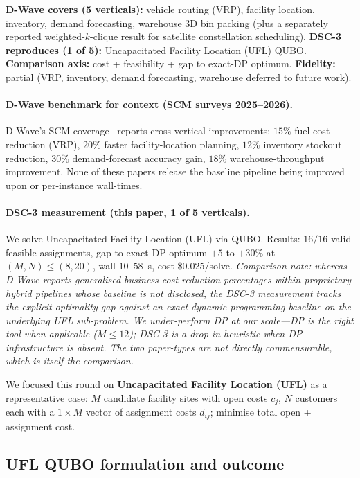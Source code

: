 \documentclass[11pt,a4paper]{article}
\begin{document}
\textbf{D-Wave covers (5 verticals):} vehicle routing (VRP), facility
location, inventory, demand forecasting, warehouse 3D bin packing
(plus a separately reported weighted-$k$-clique result for satellite
constellation scheduling).
\textbf{DSC-3 reproduces (1 of 5):} Uncapacitated Facility Location
(UFL) QUBO.
\textbf{Comparison axis:} cost + feasibility + gap to exact-DP
optimum.
\textbf{Fidelity:} partial (VRP, inventory, demand forecasting,
warehouse deferred to future work).

\paragraph{D-Wave benchmark for context (SCM surveys 2025--2026).}
D-Wave's SCM coverage~\cite{scm_survey_2025, scm_mdpi_2025,
scm_algorithms_2026} reports cross-vertical improvements:
$15\%$ fuel-cost reduction (VRP), $20\%$ faster facility-location
planning, $12\%$ inventory stockout reduction, $30\%$ demand-forecast
accuracy gain, $18\%$ warehouse-throughput improvement. None of these
papers release the baseline pipeline being improved upon or
per-instance wall-times.

\paragraph{DSC-3 measurement (this paper, 1 of 5 verticals).}
We solve Uncapacitated Facility Location (UFL) via QUBO. Results:
$16/16$ valid feasible assignments, gap to exact-DP optimum $+5$ to
$+30\%$ at $(M, N)\!\le\!(8, 20)$, wall $10$--$58$~s, cost
\$0.025/solve. \emph{Comparison note: whereas D-Wave reports
generalised business-cost-reduction percentages within proprietary
hybrid pipelines whose baseline is not disclosed, the DSC-3
measurement tracks the explicit optimality gap against an exact
dynamic-programming baseline on the underlying UFL sub-problem. We
under-perform DP at our scale---DP is the right tool when applicable
($M\!\le\!12$); DSC-3 is a drop-in heuristic when DP infrastructure
is absent. The two paper-types are not directly commensurable, which
is itself the comparison.}

\medskip
We focused this round on \textbf{Uncapacitated Facility Location (UFL)} as
a representative case: $M$ candidate facility sites with open costs
$c_j$, $N$ customers each with a $1\times M$ vector of assignment
costs $d_{ij}$; minimise total open + assignment cost.

\subsection{UFL QUBO formulation and outcome}
\end{document}
